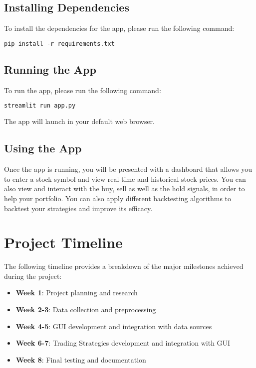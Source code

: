 \subsection*{Installing Dependencies}

To install the dependencies for the app, please run the following command:

\begin{lstlisting}[language=Python]
pip install -r requirements.txt
\end{lstlisting}

\subsection*{Running the App}

To run the app, please run the following command:

\begin{lstlisting}[language=Python]
streamlit run app.py
\end{lstlisting}

The app will launch in your default web browser.

\subsection*{Using the App}

Once the app is running, you will be presented with a dashboard that allows you to enter a stock symbol and view real-time and historical stock prices. You can also view and interact with the buy, sell as well as the hold signals, in order to help your portfolio. You can also apply different backtesting algorithms to backtest your strategies and improve its efficacy.

\section*{Project Timeline}

The following timeline provides a breakdown of the major milestones achieved during the project:

\begin{itemize}
\item \textbf{Week 1}: Project planning and research
\item \textbf{Week 2-3}: Data collection and preprocessing
\item \textbf{Week 4-5}: GUI development and integration with data sources
\item \textbf{Week 6-7}: Trading Strategies development and integration with GUI
\item \textbf{Week 8}: Final testing and documentation
\end{itemize}